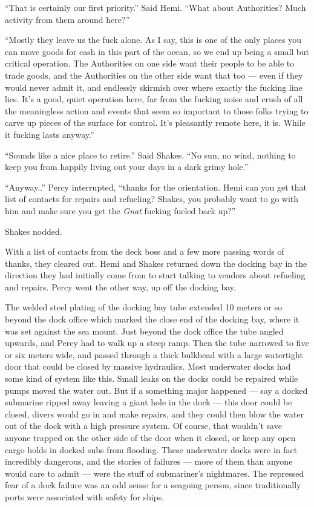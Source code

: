 \documentclass[
]{scrbook}
\begin{document}
``That is certainly our first priority.'' Said Hemi. ``What about
Authorities? Much activity from them around here?''

``Mostly they leave us the fuck alone. As I say, this is one of the only
places you can move goods for cash in this part of the ocean, so we end
up being a small but critical operation. The Authorities on one side
want their people to be able to trade goods, and the Authorities on the
other side want that too --- even if they would never admit it, and
endlessly skirmish over where exactly the fucking line lies. It's a
good, quiet operation here, far from the fucking noise and crush of all
the meaningless action and events that seem so important to those folks
trying to carve up pieces of the surface for control. It's pleasantly
remote here, it is. While it fucking lasts anyway.''

``Sounds like a nice place to retire.'' Said Shakes. ``No sun, no wind,
nothing to keep you from happily living out your days in a dark grimy
hole.''

``Anyway..'' Percy interrupted, ``thanks for the orientation. Hemi can
you get that list of contacts for repairs and refueling? Shakes, you
probably want to go with him and make sure you get the \emph{Gnat}
fucking fueled back up?''

Shakes nodded.

With a list of contacts from the deck boss and a few more passing words
of thanks, they cleared out. Hemi and Shakes returned down the docking
bay in the direction they had initially come from to start talking to
vendors about refueling and repairs. Percy went the other way, up off
the docking bay.

The welded steel plating of the docking bay tube extended 10 meters or
so beyond the dock office which marked the close end of the docking bay,
where it was set against the sea mount. Just beyond the dock office the
tube angled upwards, and Percy had to walk up a steep ramp. Then the
tube narrowed to five or six meters wide, and passed through a thick
bulkhead with a large watertight door that could be closed by massive
hydraulics. Most underwater docks had some kind of system like this.
Small leaks on the docks could be repaired while pumps moved the water
out. But if a something major happened --- say a docked submarine ripped
away leaving a giant hole in the dock --- this door could be closed,
divers would go in and make repairs, and they could then blow the water
out of the dock with a high pressure system. Of course, that wouldn't
save anyone trapped on the other side of the door when it closed, or
keep any open cargo holds in docked subs from flooding. These underwater
docks were in fact incredibly dangerous, and the stories of failures ---
more of them than anyone would care to admit --- were the stuff of
submariner's nightmares. The repressed fear of a dock failure was an odd
sense for a seagoing person, since traditionally ports were associated
with safety for ships.
\end{document}
